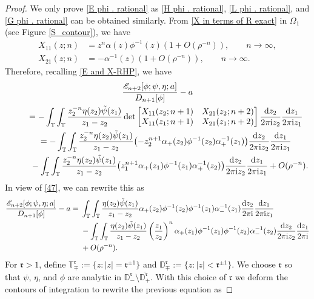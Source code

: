 \documentclass[pdftex]{sigma}
\numberwithin{equation}{section}
\newcommand{\D}{{\mathbb D}}
\newcommand{\T}{{\mathbb T}}
\newcommand{\al}{\alpha}
\newcommand{\Om}{\Omega}
\newcommand{\ii}{{\rm i}}
\newcommand{\dd}{{\rm d}}
\begin{document}
		\begin{proof}
			We only prove \eqref{E phi . rational} as \eqref{H phi . rational}, \eqref{L phi . rational}, and \eqref{G phi . rational} can be obtained similarly. 			From \eqref{X in terms of R exact} in $\Om_1$ (see Figure \ref{S_contour}), we have
			\begin{align*}
				X_{11}(z;n) & = z^n \al(z) \phi^{-1}(z) ( 1+ O(\rho^{-n})),\qquad n \to \infty, \\
				X_{21}(z;n) & = - \al^{-1}(z) ( 1+ O(\rho^{-n})),\qquad n \to \infty.
			\end{align*}
			Therefore, recalling \eqref{E and X-RHP}, we have
			\begin{gather*}
					\frac{\mathscr{E}_{n+2}[\phi;\psi, \eta ;a]}{D_{n+1}[\phi]} - a \\
\qquad = - \int_{\T} \int_{\T} \frac{z^{-n}_2\eta(z_2) \Tilde{\psi}(z_1)}{z_1-z_2} \det \begin{bmatrix}
						X_{11}(z_2;n+1) & X_{21}(z_2;n+2) \\
						X_{11}(z_1;n+1) & X_{21}(z_1;n+2)
					\end{bmatrix} \frac{\dd z_2}{2 \pi \ii z_2} \frac{\dd z_1}{2 \pi \ii z_1} \\
\qquad= - \int_{\T} \int_{\T} \frac{z^{-n}_2\eta(z_2) \Tilde{\psi}(z_1)}{z_1-z_2} \bigl( - z^{n+1}_2 \al_+(z_2) \phi^{-1}(z_2) \al^{-1}_+(z_1) \bigr)\frac{\dd z_2}{2 \pi \ii z_2} \frac{\dd z_1}{2 \pi \ii z_1} \\
\phantom{\qquad=}{} - \int_{\T} \int_{\T} \frac{z^{-n}_2\eta(z_2) \Tilde{\psi}(z_1)}{z_1-z_2} \big( z^{n+1}_1 \al_+(z_1) \phi^{-1}(z_1) \al^{-1}_+(z_2) \big)\frac{\dd z_2}{2 \pi \ii z_2} \frac{\dd z_1}{2 \pi \ii z_1} + O(\rho^{-n}).
			\end{gather*}
			In view of \eqref{47}, we can rewrite this as
			\begin{align*}
					\frac{\mathscr{E}_{n+2}[\phi;\psi, \eta ;a]}{D_{n+1}[\phi]} - a ={} &\int_{\T} \int_{\T} \frac{\eta(z_2) \Tilde{\psi}(z_1)}{z_1-z_2} \al_+(z_2) \phi^{-1}(z_2) \phi^{-1}(z_1) \al^{-1}_-(z_1) \frac{\dd z_2}{2 \pi \ii } \frac{\dd z_1}{2 \pi \ii z_1} \\
 & - \int_{\T} \int_{\T} \frac{\eta(z_2) \Tilde{\psi}(z_1)}{z_1-z_2} \left( \frac{z_1}{z_2} \right)^n \al_+(z_1) \phi^{-1}(z_1) \phi^{-1}(z_2) \al^{-1}_-(z_2) \frac{\dd z_2}{2 \pi \ii z_2} \frac{\dd z_1}{2 \pi \ii }\\
 & + O(\rho^{-n}).
			\end{align*}
			For $\mathfrak{r}>1$, define $	\T^{\mathfrak{r}}_{\mp} := \big\{ z\colon |z|= \mathfrak{r}^{\pm1} \big\}$ and $	\D^{\mathfrak{r}}_{\mp} := \big\{ z\colon |z|< \mathfrak{r}^{\pm1} \big\}$. We choose $\mathfrak{r}$ so that $\psi$, $\eta$, and $\phi$ are analytic in $\D^{\mathfrak{r}}_- \setminus \overline{\D^{\mathfrak{r}}_+}$. With this choice of $\mathfrak{r}$ we deform the contours of integration to rewrite the previous equation as

\end{proof}
\end{document}
